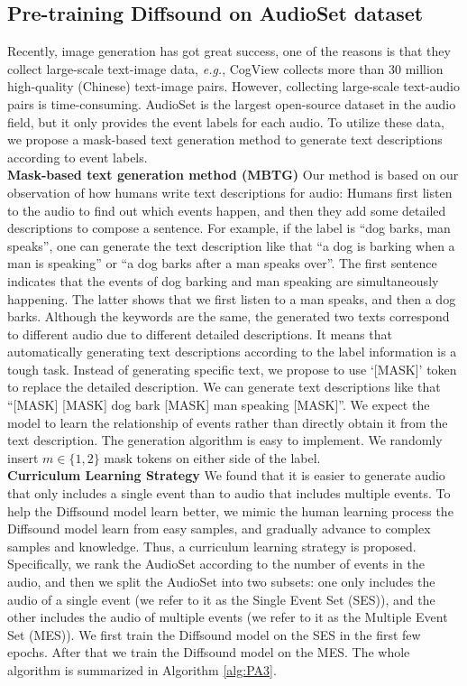 \documentclass[lettersize,journal]{IEEEtran}
\begin{document}
\subsection{Pre-training Diffsound on AudioSet dataset} 
Recently, image generation has got great success, one of the reasons is that they collect large-scale text-image data, \textit{e.g.}, CogView \cite{ding2021cogview} collects more than 30 million high-quality (Chinese) text-image pairs. However, collecting large-scale text-audio pairs is time-consuming. AudioSet \cite{gemmeke2017audio} is the largest open-source dataset in the audio field, but it only provides the event labels for each audio. To utilize these data, we propose a mask-based text generation method to generate text descriptions according to event labels. \\
\textbf{Mask-based text generation method (MBTG)}
Our method is based on our observation of how humans write text descriptions for audio: Humans first listen to the audio to find out which events happen, and then they add some detailed descriptions to compose a sentence. For example, if the label is ``dog barks, man speaks'', one can generate the text description like that ``a dog is barking when a man is speaking'' or ``a dog barks after a man speaks over''. The first sentence indicates that the events of dog barking and man speaking are simultaneously happening. The latter shows that we first listen to a man speaks, and then a dog barks. Although the keywords are the same, the generated two texts correspond to different audio due to different detailed descriptions. It means that automatically generating text descriptions according to the label information is a tough task. Instead of generating specific text, we propose to use `[MASK]' token to replace the detailed description. We can generate text descriptions like that ``[MASK] [MASK] dog bark [MASK] man speaking [MASK]''. We expect the model to learn the relationship of events rather than directly obtain it from the text description. The generation algorithm is easy to implement. We randomly insert $m \in \{1,2\}$ mask tokens on either side of the label. \\
\noindent\textbf{Curriculum Learning Strategy}
We found that it is easier to generate audio that only includes a single event than to audio that includes multiple events. To help the Diffsound model learn better, we mimic the human learning process {\color{black}{by letting}} the Diffsound model learn from easy samples, and gradually advance to complex samples and knowledge. Thus, a curriculum learning \cite{bengio2009curriculum} strategy is proposed. Specifically, we rank the AudioSet according to the number of events in the audio, and then we split the AudioSet into two subsets: one only includes the audio of a single event (we refer to it as the Single Event Set (SES)), and the other includes the audio of multiple events (we refer to it as the Multiple Event Set (MES)). We first train the Diffsound model on the SES in the first few epochs. After that we train the Diffsound model on the MES. The whole algorithm is summarized in Algorithm \ref{alg:PA3}.  
\end{document}
